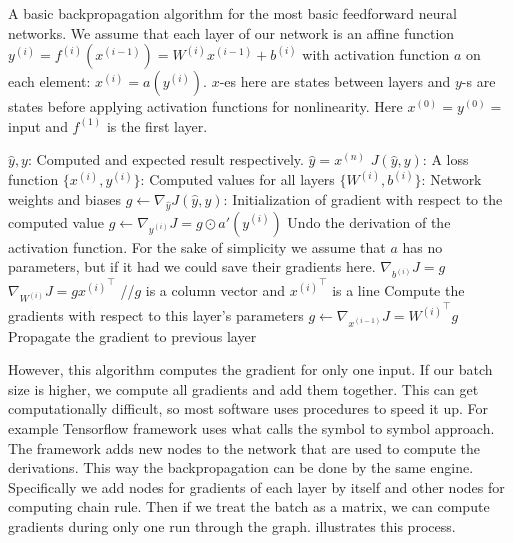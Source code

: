 \begin{algorithm}[h]
\caption{A basic backpropagation algorithm for the most basic feedforward neural networks. We assume that each layer of our network is an affine function $y^{(i)}=f^{(i)}(x^{(i-1)})=W^{(i)}x^{(i-1)}+b^{(i)}$ with activation function $a$ on each element: $x^{(i)}=a(y^{(i)})$. $x$-es here are states between layers and $y$-s are states before applying activation functions for nonlinearity. Here $x^{(0)}=y^{(0)}=$ input and $f^{(1)}$ is the first layer.}
\begin{algorithmic}
\REQUIRE $\widehat{y},y$: Computed and expected result respectively. $\widehat{y}=x^{(n)}$
\REQUIRE $J(\widehat{y},y)$: A loss function
\REQUIRE $\{x^{(i)},y^{(i)}\}$: Computed values for all layers 
\REQUIRE $\{W^{(i)},b^{(i)}\}$: Network weights and biases
\STATE $g\leftarrow \nabla_{\hat{y}}J(\widehat{y},y)$: Initialization of gradient with respect to the computed value
	\STATE $g\leftarrow \nabla_{y^{(i)}}J=g\odot a'(y^{(i)})$
	\STATE Undo the derivation of the activation function. For the sake of simplicity we assume that $a$ has no parameters, but if it had we could save their gradients here.
	\STATE 
	\STATE $\nabla_{b^{(i)}}J=g$
	\STATE $\nabla_{W^{(i)}}J=g{x^{(i)}}^\top$ //$g$ is a column vector and ${x^{(i)}}^\top$ is a line
	\STATE Compute the gradients with respect to this layer's parameters
	\STATE
	\STATE $g\leftarrow \nabla_{x^{(i-1)}}J={W^{(i)}}^\top g$
	\STATE Propagate the gradient to previous layer
\ENDFOR
\end{algorithmic}
\end{algorithm}

However, this algorithm computes the gradient for only one input. If our batch size is higher, we compute all gradients and add them together. This can get computationally difficult, so most software uses procedures to speed it up. For example Tensorflow framework uses what \cite{neural} calls the symbol to symbol approach. The framework adds new nodes to the network that are used to compute the derivations. This way the backpropagation can be done by the same engine. Specifically we add nodes for gradients of each layer by itself and other nodes for computing chain rule. Then if we treat the batch as a matrix, we can compute gradients during only one run through the graph.  illustrates this process.

